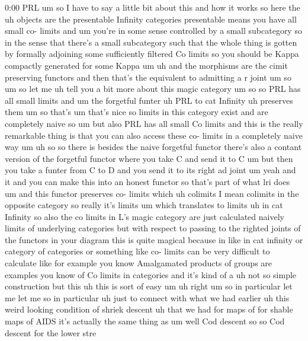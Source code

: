 \begin{unfinished}{0:00}
PRL  um  so  I  have  to  say  a  little  bit
about  this  and  how  it  works  so  here  the
uh
objects  are  the
presentable  Infinity
categories  presentable  means  you  have
all  small  co-  limits  and  um  you're  in
some  sense  controlled  by  a  small
subcategory  so  in  the  sense  that  there's
a  small  subcategory  such  that  the  whole
thing  is  gotten  by  formally  adjoining
some  sufficiently  filtered  Co  limits  so
you  should  be  Kappa  compactly  generated
for  some
Kappa  um
uh  and  the
morphisms  are  the  cimit  preserving
functors  and  then  that's  the  equivalent
to  admitting  a  r
joint
um
so
um  so  let  me  uh  tell  you  a  bit  more
about  this  magic
category
um  so  so  PRL  has  all  small
limits  and  um  the  forgetful
funter
uh  PRL  to  cat  Infinity  uh  preserves
them
um  so  that's
um  that's  nice  so  limits  in  this
category  exist  and  are  completely  naive
so  um  but  also  PRL  has  all  small  Co
limits
and  this  is  the  really  remarkable  thing
is  that  you  can  also  access  these  co-
limits  in  a  completely  naive  way
um  uh  so  so  there  is  besides  the  naive
forgetful  functor  there's  also  a  contant
version  of  the  forgetful  functor  where
you  take  C  and  send  it  to  C  um  but  then
you  take  a  funter  from  C  to  D  and  you
send  it  to  its  right  ad  joint
um  yeah  and  it  and  you  can  make  this
into  an  honest  functor  so  that's  part  of
what  lri  does  um  and  this  functor
preserves  co-
limits  which  uh  colimits  I  mean  colimits
in  the  opposite  category  so  really  it's
limits
um  which  translates  to  limits  uh  in  cat
Infinity  so  also  the  co  limits  in  L's
magic  category  are  just  calculated
naively  limits  of  underlying  categories
but  with  respect  to  passing  to  the
righted  joints  of  the  functors  in  your
diagram  this  is  quite  magical  because  in
like  in  cat  infinity  or  category  of
categories  or  something  like  co-  limits
can  be  very  difficult  to  calculate  like
for  example  you  know  Amalgamated
products  of  groups  are  examples  you  know
of  Co  limits  in  categories  and  it's  kind
of  a  uh  not  so  simple  construction  but
this  uh  this  is  sort  of
easy
um  uh
right  um  so  in  particular  let  me  let  me
so  in  particular  uh  just  to  connect  with
what  we  had  earlier  uh  this  weird
looking  condition  of  shriek
descent  uh  that  we  had  for  maps  of  for
shable  maps  of  AIDS  it's  actually  the
same  thing  as  um  well  Cod  descent
so  so  Cod
descent  for  the  lower  stre

\end{unfinished}
